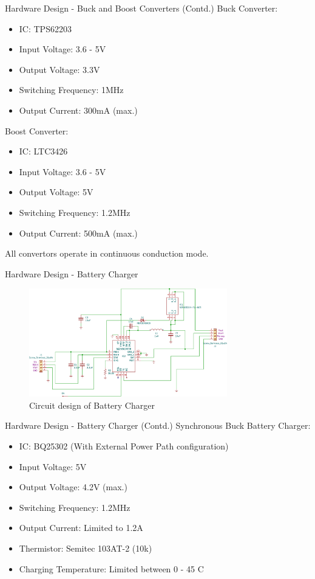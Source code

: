\documentclass[aspectratio=169]{beamer}
\begin{document}
\begin{frame}{Hardware Design - Buck and Boost Converters (Contd.)}
	Buck Converter:
	\begin{itemize}
		\item IC: TPS62203
		\item Input Voltage: 3.6 - 5V
		\item Output Voltage: 3.3V
		\item Switching Frequency: 1MHz
		\item Output Current: 300mA (max.)
		\end{itemize}
		Boost Converter:
			\begin{itemize}
			\item IC: LTC3426
			\item Input Voltage: 3.6 - 5V
			\item Output Voltage: 5V
			\item Switching Frequency: 1.2MHz
			\item Output Current: 500mA (max.)
		\end{itemize}
	All convertors operate in continuous conduction mode.
	\end{frame}

\begin{frame}{Hardware Design - Battery Charger }
	\begin{figure}[h]
		\centering
		\includegraphics[width=0.77\textwidth]{diag/charg.pdf}
		\caption{Circuit design of Battery Charger}
		\label{fig:mesh1}
	\end{figure}
\end{frame}


\begin{frame}{Hardware Design - Battery Charger (Contd.)}
	Synchronous Buck Battery Charger:
	\begin{itemize}
		\item IC: BQ25302 (With External Power Path configuration)
		\item Input Voltage: 5V
		\item Output Voltage: 4.2V (max.)
		\item Switching Frequency: 1.2MHz
		\item Output Current: Limited to 1.2A
		\item Thermistor: Semitec 103AT-2 (10k\ohm)
		\item Charging Temperature: Limited between 0 - 45 C
				\end{itemize}
	\end{frame}
\end{document}
